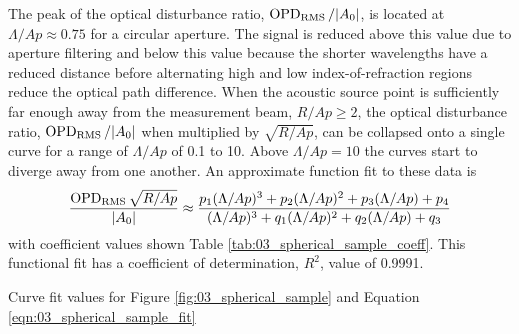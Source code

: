 The peak of the optical disturbance ratio, $\operatorname{OPD_{RMS}}/|A_0|$, is located at $\Lambda/Ap\approx0.75$ for a circular aperture.
The signal is reduced above this value due to aperture filtering and below this value because the shorter wavelengths have a reduced distance before alternating high and low index-of-refraction regions reduce the optical path difference.
When the acoustic source point is sufficiently far enough away from the measurement beam, $R/Ap\geq2$, the optical disturbance ratio, $\operatorname{OPD_{RMS}}/|A_0|$ when multiplied by $\sqrt{R/Ap}$, can be collapsed onto a single curve for a range of $\Lambda/Ap$ of 0.1 to 10.
Above $\Lambda/Ap=10$ the curves start to diverge away from one another.
An approximate function fit to these data is
\begin{equation}
  \frac{\operatorname{OPD_{RMS}}\sqrt{R/Ap}}{|A_0|} \approx \frac{p_1(\Lambda/Ap)^3+p_2(\Lambda/Ap)^2+p_3(\Lambda/Ap)+p_4}{(\Lambda/Ap)^3+q_1(\Lambda/Ap)^2+q_2(\Lambda/Ap)+q_3}
  \label{eqn:03_spherical_sample_fit}
\end{equation}
with coefficient values shown Table \ref{tab:03_spherical_sample_coeff}.
This functional fit has a coefficient of determination, $R^2$, value of 0.9991.
\begin{table}
\centering
\caption{Curve fit values for Figure \ref{fig:03_spherical_sample} and Equation \ref{eqn:03_spherical_sample_fit}}

\label{tab:03_spherical_sample_coeff}
\end{table}


